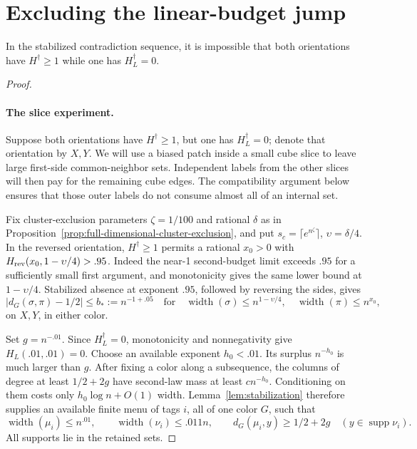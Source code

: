 \section{Excluding the linear-budget jump}
\label{sec:jump-to-large-bias-only-at-linear-budget}

\begin{proposition}\label{prop:linear-budget-jump-exclusion}
In the stabilized contradiction sequence, it is impossible that both orientations have \(H^\dagger\ge1\) while one has \(H_L^\dagger=0\).
\end{proposition}

\begin{proof}\leavevmode\par
\paragraph{The slice experiment.}
Suppose both orientations have \(H^\dagger\ge1\), but one has \(H_L^\dagger=0\); denote that orientation by \(X,Y\). We will use a biased patch inside a small cube slice to leave large first-side common-neighbor sets. Independent labels from the other slices will then pay for the remaining cube edges. The compatibility argument below ensures that those outer labels do not consume almost all of an internal set.

Fix cluster-exclusion parameters \(\zeta=1/100\) and rational \(\delta\) as in Proposition~\ref{prop:full-dimensional-cluster-exclusion}, and put
\(s_c=\lceil e^{n^\zeta}\rceil\), \(\upsilon=\delta/4\).
In the reversed orientation, \(H^\dagger\ge1\) permits a rational \(x_0>0\) with
\(H_{\rm rev}(x_0,1-\upsilon/4)>.95\).
Indeed the near-1 second-budget limit exceeds \(.95\) for a sufficiently small first argument, and monotonicity gives the same lower bound at \(1-\upsilon/4\). Stabilized absence at exponent \(.95\), followed by reversing the sides, gives
\begin{equation}
 |d_G(\sigma,\pi)-1/2|\le b_*:=n^{-1+.05}
 \quad\text{for}\quad
 \operatorname{width}(\sigma)\le n^{1-\upsilon/4},\quad
 \operatorname{width}(\pi)\le n^{x_0},
 \label{eq:source-6}
\end{equation}
on \(X,Y\), in either color.

Set \(g=n^{-.01}\). Since \(H_L^\dagger=0\), monotonicity and nonnegativity give \(H_L(.01,.01)=0\). Choose an available exponent \(h_0<.01\). Its surplus \(n^{-h_0}\) is much larger than \(g\). After fixing a color along a subsequence, the columns of degree at least \(1/2+2g\) have second-law mass at least \(c n^{-h_0}\). Conditioning on them costs only \(h_0\log n+O(1)\) width. Lemma~\ref{lem:stabilization} therefore supplies an available finite menu of tags \(i\), all of one color \(G\), such that
\[
 \operatorname{width}(\mu_i)\le n^{.01},\qquad
 \operatorname{width}(\nu_i)\le .011n,\qquad
 d_G(\mu_i,y)\ge1/2+2g\quad(y\in\operatorname{supp}\nu_i).
\]
All supports lie in the retained sets.


\end{proof}
